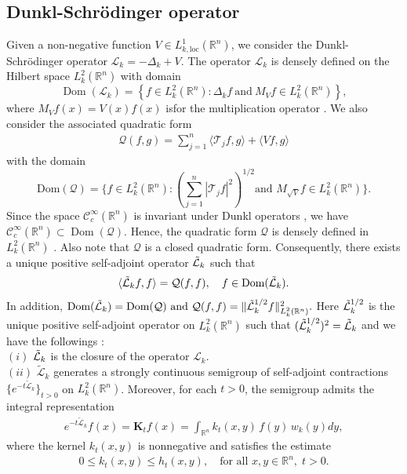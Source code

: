 \documentclass[11pt, reqno]{amsproc}
\theoremstyle{definition}
\theoremstyle{remark}
\numberwithin{equation}{section}
\begin{document}
\subsection{Dunkl-Schr\"odinger operator}Given a non-negative function $V\in L_{k,\text{loc}}^1(\mathbb{R}^n)$, we consider the Dunkl-Schr\"odinger operator $\mathcal{L}_k = -\Delta_k + V$. The operator $\mathcal{L}_k$ is densely defined on the Hilbert space $L_k^2(\mathbb{R}^n)$ with domain  
\[
\operatorname{Dom}(\mathcal{L}_k) = \left\{ f \in L_k^2(\mathbb{R}^n) : \Delta_k f \ \text{and} \ M_V f \in L_k^2(\mathbb{R}^n) \right\},
\]
where $M_V f(x) = V(x)f(x)$ isfor  the multiplication operator \cite{Amri-2018}. We also consider the associated quadratic form
\begin{align*}
    \mathcal{Q}(f, g) = \sum_{j=1}^n \langle \mathcal{T}_jf, g \rangle + \langle Vf, g\rangle
\end{align*} with the domain 
$$ \text{Dom}(\mathcal{Q})= \Bigg\{f\in L_k^2(\mathbb{R}^n):  \left(\sum_{j=1}^n|\mathcal{T}_jf|^2 \right)^{1/2}  \text{and } M_{\sqrt{V}}f \in L_k^2(\mathbb{R}^n)\Bigg\}.
$$ 
Since the space $\mathcal{C}_c^\infty(\mathbb{R}^n)$ is invariant under Dunkl operators \cite{DJ1}, we have  
$\mathcal{C}_c^\infty(\mathbb{R}^n) \subset \operatorname{Dom}(\mathcal{Q})$. Hence, the quadratic form $\mathcal{Q}$ is densely defined in $L_k^2(\mathbb{R}^n)$ \cite[Lemma 4.1]{Amri-2018}. Also note that $\mathcal{Q}$ is a closed quadratic form. Consequently, there exists a unique positive self-adjoint operator $\Tilde{\mathcal{L}}_k$ such that 
\begin{align*}
    \langle \Tilde{\mathcal{L}}_kf, f \rangle = \mathcal{Q}(f, f), \quad f \in \text{Dom}(\Tilde{\mathcal{L}}_k).
\end{align*} In addition,  $ \text{Dom}(\Tilde{\mathcal{L}}_k) = \text{Dom}(\mathcal{Q}) \text{ and }  \mathcal{Q}(f,f)= \|\Tilde{\mathcal{L}}_k^{1/2}f\|^2_{L_k^2(\mathbb{R}^n)}.$
Here $\Tilde{\mathcal{L}}_k^{1/2}$ is the unique positive self-adjoint operator on $L_k^2(\mathbb{R}^n)$ such that $(\Tilde{\mathcal{L}}_k^{1/2})^2=\Tilde{\mathcal{L}}_k$ and we have the followings \cite{Amri-2018}:\\
$(i)$ $\Tilde{\mathcal{L}}_k$ is the closure of the operator $\mathcal{L}_k$.\\
$(ii)$ $\widetilde{\mathcal{L}}_k$ generates a strongly continuous semigroup of self-adjoint contractions 
$\{e^{-t\widetilde{\mathcal{L}}_k}\}_{t>0}$ on $L_k^2(\mathbb{R}^n)$. 
Moreover, for each $t>0$, the semigroup admits the integral representation
\begin{align} \label{Integral operator}
e^{-t\widetilde{\mathcal{L}}_k} f(x)
= \mathbf{K}_t f(x)
= \int_{\mathbb{R}^n} k_t(x,y)\, f(y)\, w_k(y)dy,
\end{align}
where the kernel $k_t(x,y)$ is nonnegative and satisfies the estimate
\begin{align}\label{kernel estimate_1}
0 \leq k_t(x,y) \leq h_t(x,y), \quad \text{for all } x,y \in \mathbb{R}^n, \; t>0.
\end{align}
\end{document}

